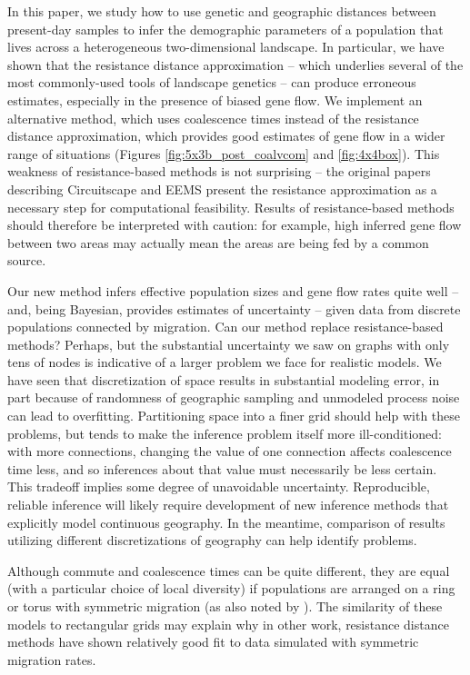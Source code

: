 \documentclass{article}
\begin{document}
In this paper, we study how to 
use genetic and geographic distances between present-day samples
to infer the demographic parameters of a population that lives across
a heterogeneous two-dimensional landscape.
In particular, we have shown that the resistance distance approximation
-- which underlies several of the most commonly-used tools of landscape genetics --
can produce erroneous estimates, especially in the presence of biased gene flow.
We implement an alternative method, 
which uses coalescence times instead of the resistance distance approximation,
which provides good estimates of gene flow in a wider range of situations
(Figures \ref{fig:5x3b_post_coalvcom} and \ref{fig:4x4box}).
This weakness of resistance-based methods is not surprising --
the original papers 
describing Circuitscape \citep{mcrae2006isolation} and EEMS \citep{petkova2016visualizing}
present the resistance approximation as a necessary step for computational feasibility. 
Results of resistance-based methods should therefore be interpreted with caution:
for example, high inferred gene flow between two areas
may actually mean the areas are being fed by a common source.

Our new method infers effective population sizes and gene flow rates quite well 
-- and, being Bayesian, provides estimates of uncertainty --
given data from discrete populations connected by migration.
Can our method replace resistance-based methods? 
Perhaps, but
the substantial uncertainty we saw on graphs with only tens of nodes
is indicative of a larger problem we face for realistic models.
We have seen that discretization of space results in substantial modeling error,
in part because of randomness of geographic sampling
and unmodeled process noise can lead to overfitting.
Partitioning space into a finer grid should help with these problems,
but tends to make the inference problem itself more ill-conditioned:
with more connections,
changing the value of one connection affects coalescence time less,
and so inferences about that value must necessarily be less certain.
This tradeoff implies some degree of unavoidable uncertainty.
Reproducible, reliable inference will likely require development of new inference methods
that explicitly model continuous geography.
In the meantime, comparison of results utilizing different discretizations of geography
can help identify problems.  


Although commute and coalescence times can be quite different,
they are equal (with a particular choice of local diversity)
if populations are arranged on a ring or torus
with symmetric migration
(as also noted by \citet{mcrae2006isolation}).
The similarity of these models to rectangular grids
may explain why in other work, resistance distance methods have shown relatively good fit to data
simulated with symmetric migration rates.
\end{document}
